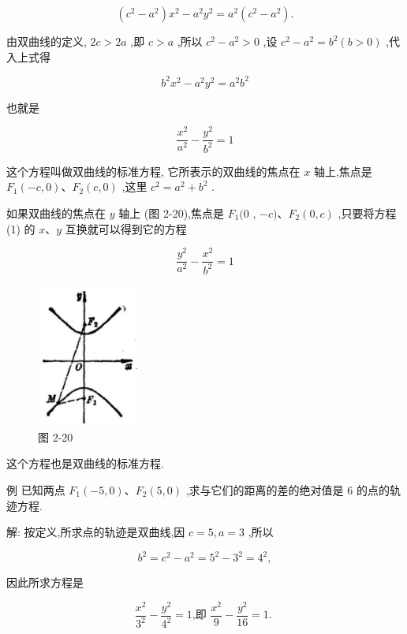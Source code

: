 \documentclass[lang=cn,newtx,10pt,scheme=chinese]{elegantbook}
\begin{document}
\[
  \left( {{c}^{2} - {a}^{2}}\right) {x}^{2} - {a}^{2}{y}^{2} = {a}^{2}\left( {{c}^{2} - {a}^{2}}\right) .
\]

由双曲线的定义, \({2c} > {2a}\) ,即 \(c > a\) ,所以 \({c}^{2} - {a}^{2} > 0\) ,设 \({c}^{2} - {a}^{2} = {b}^{2}\left( {b > 0}\right)\) ,代入上式得

\[
    {b}^{2}{x}^{2} - {a}^{2}{y}^{2} = {a}^{2}{b}^{2}
\]

也就是

\[
  \frac{{x}^{2}}{{a}^{2}} - \frac{{y}^{2}}{{b}^{2}} = 1 \tag{1}
\]

这个方程叫做双曲线的标准方程, 它所表示的双曲线的焦点在 \(x\) 轴上,焦点是 \({F}_{1}\left( {-c,0}\right) \text{、}{F}_{2}\left( {c,0}\right)\) ,这里 \({c}^{2} = {a}^{2} + {b}^{2}\) .

如果双曲线的焦点在 \(y\) 轴上 (图 2-20),焦点是 \({F}_{1}(0\) , \(- c)\text{、}{F}_{2}\left( {0,c}\right)\) ,只要将方程 (1) 的 \(x\text{、}y\) 互换就可以得到它的方程

\[
  \frac{{y}^{2}}{{a}^{2}} - \frac{{x}^{2}}{{b}^{2}} = 1
\]

\begin{figure}[h]
  \centering
  \includegraphics[max width=0.3\textwidth]{images/01912cc2-ffb6-728e-9ae7-b113ff05c64b_98_269004.jpg}
  \caption{图 2-20}
\end{figure}



这个方程也是双曲线的标准方程.

例 已知两点 \({F}_{1}\left( {-5,0}\right) \text{、}{F}_{2}\left( {5,0}\right)\) ,求与它们的距离的差的绝对值是 6 的点的轨迹方程.

解: 按定义,所求点的轨迹是双曲线,因 \(c = 5,a = 3\) ,所以

\[
    {b}^{2} = {c}^{2} - {a}^{2} = {5}^{2} - {3}^{2} = {4}^{2},
\]

因此所求方程是

\[
  \frac{{x}^{2}}{{3}^{2}} - \frac{{y}^{2}}{{4}^{2}} = 1\text{,即 }\frac{{x}^{2}}{9} - \frac{{y}^{2}}{16} = 1\text{. }
\]
\end{document}
